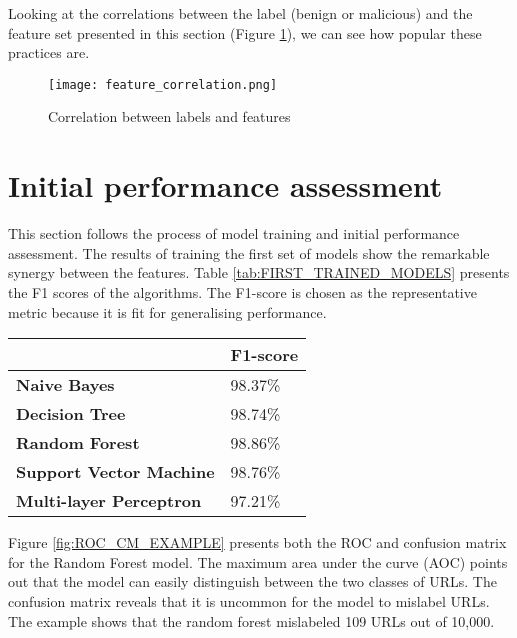 Looking at the correlations between the label (benign or malicious) and the feature set presented in this section (Figure \ref{fig:FEATURE_CORRELATION}), we can see how popular these practices are.

\begin{figure}[t]
	\centering
	\texttt{[image: feature\_correlation.png]}
	\caption{Correlation between labels and features}
	\label{fig:FEATURE_CORRELATION}
\end{figure}

\section{Initial performance assessment}
This section follows the process of model training and initial performance assessment. The results of training the first set of models show the remarkable synergy between the features. Table \ref{tab:FIRST_TRAINED_MODELS} presents the F1 scores of the algorithms. The F1-score is chosen as the representative metric because it is fit for generalising performance.

\begin{singlespace}
	\begin{center}
		\label{tab:FIRST_TRAINED_MODELS}
		\begin{tabular}{ | m{13em} | m{13em} | }
			\hline
			                                & \textbf{F1-score} \\
			\hline
			\textbf{Naive Bayes}            & 98.37\%           \\
			\hline
			\textbf{Decision Tree}          & 98.74\%           \\
			\hline
			\textbf{Random Forest}          & 98.86\%           \\
			\hline
			\textbf{Support Vector Machine} & 98.76\%           \\
			\hline
			\textbf{Multi-layer Perceptron} & 97.21\%           \\
			\hline
		\end{tabular}
		\captionsetup{type=table}\caption{F-measure results of models training}
	\end{center}
\end{singlespace}

Figure \ref{fig:ROC_CM_EXAMPLE} presents both the ROC and confusion matrix for the Random Forest model. The maximum area under the curve (AOC) points out that the model can easily distinguish between the two classes of URLs. The confusion matrix reveals that it is uncommon for the model to mislabel URLs. The example shows that the random forest mislabeled 109 URLs out of 10,000.

